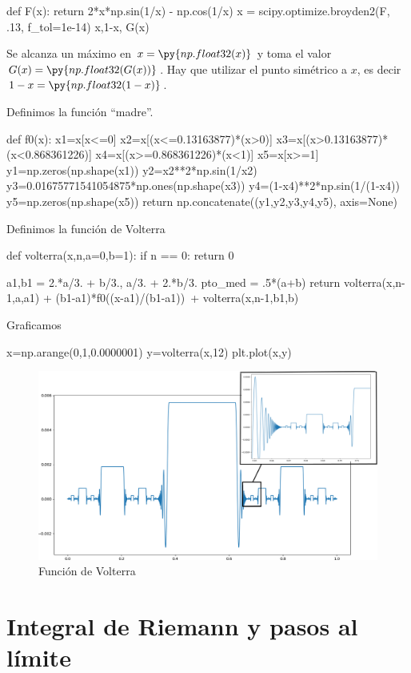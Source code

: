 \begin{pyblock}
def F(x):
    return 2*x*np.sin(1/x) - np.cos(1/x)
x = scipy.optimize.broyden2(F, .13, f_tol=1e-14)
x,1-x, G(x)
\end{pyblock}

Se alcanza un máximo en $x=\py{np.float32(x)}$ y toma el valor $G(x)=\py{np.float32(G(x))}$. Hay que utilizar el punto simétrico a $x$, es decir $1-x=\py{np.float32(1-x)}$.


Definimos la función ``madre''.



\begin{pyblock}
def f0(x):
    x1=x[x<=0]
    x2=x[(x<=0.13163877)*(x>0)]
    x3=x[(x>0.13163877)*(x<0.868361226)]
    x4=x[(x>=0.868361226)*(x<1)]
    x5=x[x>=1]
    y1=np.zeros(np.shape(x1))
    y2=x2**2*np.sin(1/x2)
    y3=0.01675771541054875*np.ones(np.shape(x3))
    y4=(1-x4)**2*np.sin(1/(1-x4))
    y5=np.zeros(np.shape(x5))
    return np.concatenate((y1,y2,y3,y4,y5), axis=None)
\end{pyblock}

Definimos la función de Volterra
\begin{pyverbatim}
def volterra(x,n,a=0,b=1):
    if n == 0:
        return 0
    
    a1,b1 = 2.*a/3. + b/3., a/3. + 2.*b/3.
    pto_med = .5*(a+b)
    return volterra(x,n-1,a,a1) + (b1-a1)*f0((x-a1)/(b1-a1))\
    + volterra(x,n-1,b1,b)
\end{pyverbatim}

Graficamos

\begin{pyverbatim}
x=np.arange(0,1,0.0000001)
y=volterra(x,12)
plt.plot(x,y)
\end{pyverbatim}


 \begin{figure}[h]
 \begin{center}
 \includegraphics[scale=0.4]{imagenes/volterra.png}
 \caption{Función de Volterra}
\end{center}
 \end{figure}


\section{Integral de Riemann y pasos al límite}

